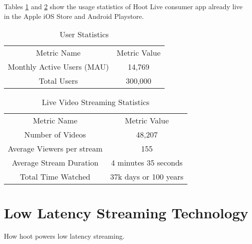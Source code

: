 \documentclass{article}
\begin{document}
Tables \ref{table:1} and \ref{table:2} show the usage statistics of Hoot Live consumer app already live in the Apple iOS Store and Android Playstore.

\setlength{\arrayrulewidth}{1mm}
\setlength{\tabcolsep}{18pt}
\renewcommand{\arraystretch}{2.5} 
 


\begin{table}[!htb]
\centering
\begin{tabular}{ |c|c| }
\hline
\rowcolor{lightgray} \multicolumn{2}{|c|}{User Statistics} \\
\hline
Metric Name & Metric Value  \\
\hline
Monthly Active Users (MAU) & 14,769 \\
Total Users & 300,000  \\
\hline
\end{tabular}
\caption{User Statistics}
\label{table:1}
\end{table}

\begin{table}[!htb]
\centering
\begin{tabular}{ |c|c| }
\hline
\rowcolor{lightgray} \multicolumn{2}{|c|}{Live Video Streaming Statistics} \\
\hline
Metric Name & Metric Value  \\
\hline
Number of Videos & 48,207 \\
Average Viewers per stream & 155 \\
Average Stream Duration & 4 minutes 35 seconds \\
Total Time Watched & 37k days or 100 years \\
\hline
\end{tabular}
\caption{Live Video Streaming Statistics}
\label{table:2}
\end{table}



\section{Low Latency Streaming Technology}
How hoot powers low latency streaming.


\end{document}
